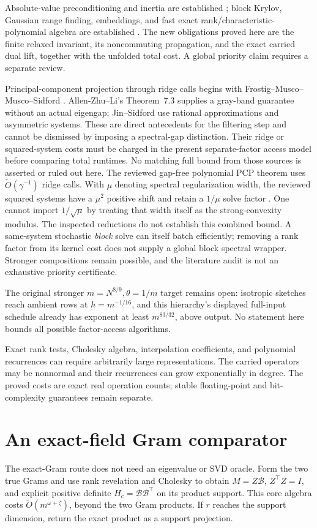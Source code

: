\documentclass[11pt]{article}
\begin{document}
Absolute-value preconditioning and inertia are established
\cite{vk,vy}; block Krylov, Gaussian range finding, embeddings, and fast
exact rank/characteristic-polynomial algebra are established
\cite{mm,cnw,jps,np}. The new obligations proved here are the finite
relaxed invariant, its noncommuting propagation, and the exact carried
dual lift, together with the unfolded total cost. A global priority
claim requires a separate review.

Principal-component projection through ridge calls begins with
Frostig--Musco--Musco--Sidford \cite{pcp16}. Allen-Zhu--Li's
Theorem~7.3 \cite{pcp17} supplies a gray-band guarantee without an
actual eigengap; Jin--Sidford \cite{pcp19} use rational approximations
and asymmetric systems. These are direct antecedents for the filtering
step and cannot be dismissed by imposing a spectral-gap distinction.
Their ridge or squared-system costs must be charged in the present
separate-factor access model before comparing total runtimes. No
matching full bound from those sources is asserted or ruled out here.
The reviewed gap-free polynomial PCP theorem uses
\(\widetilde O(\gamma^{-1})\) ridge calls. With \(\mu\) denoting
spectral regularization width, the reviewed squared systems have a
\(\mu^2\) positive shift and retain a \(1/\mu\) solve factor
\cite[Theorem 3]{pcp19}. One cannot import \(1/\sqrt\mu\) by treating
that width itself as the strong-convexity modulus. The inspected
reductions do not establish this combined bound. A same-system stochastic
\emph{block} solve can itself batch efficiently; removing a rank factor
from its kernel cost does not supply a global block spectral wrapper.
Stronger compositions remain possible, and the literature audit is not
an exhaustive priority certificate.

The original stronger
\(m=N^{8/9},\theta=1/m\) target remains open: isotropic sketches reach
ambient rows at \(h=m^{-1/16}\), and this hierarchy's displayed full-input
schedule already has exponent at least \(m^{83/32}\), above output.
No statement here bounds all possible factor-access algorithms.

Exact rank tests, Cholesky algebra, interpolation coefficients, and
polynomial recurrences can require arbitrarily large representations.
The carried operators may be nonnormal and their recurrences can grow
exponentially in degree. The proved costs are exact real operation
counts; stable floating-point and bit-complexity guarantees remain separate.

\appendix
\section{An exact-field Gram comparator}\label{app:gram}
The exact-Gram route does not need an eigenvalue or SVD oracle.
Form the two true Grams and use rank revelation and Cholesky to obtain
\(M=Z\mathcal B\), \(Z^\top Z=I\), and explicit positive definite
\(H_c=\mathcal B\mathcal B^\top\) on its product support.
This core algebra costs \(\widetilde O(m^{\omega+\zeta})\), beyond
the two Gram products. If \(r\) reaches the support dimension, return
the exact product as a support projection.
\end{document}
